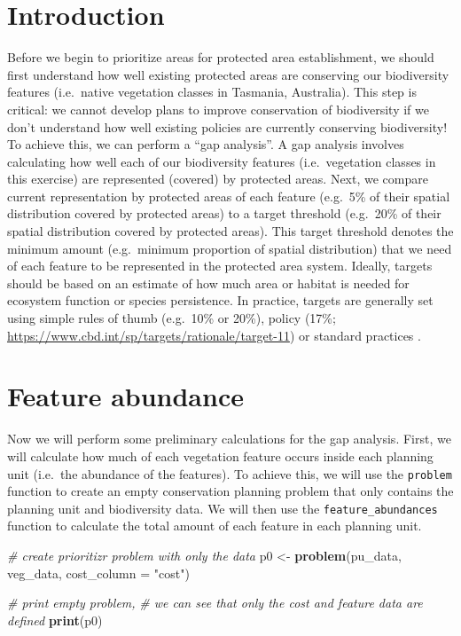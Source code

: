 \documentclass[12pt,]{book}
\newenvironment{Shaded}{\begin{snugshade}}{\end{snugshade}}
\newcommand{\KeywordTok}[1]{\textcolor[rgb]{0.13,0.29,0.53}{\textbf{#1}}}
\newcommand{\DataTypeTok}[1]{\textcolor[rgb]{0.13,0.29,0.53}{#1}}
\newcommand{\StringTok}[1]{\textcolor[rgb]{0.31,0.60,0.02}{#1}}
\newcommand{\CommentTok}[1]{\textcolor[rgb]{0.56,0.35,0.01}{\textit{#1}}}
\newcommand{\NormalTok}[1]{#1}
\begin{document}
\section{Introduction}\label{introduction-1}

Before we begin to prioritize areas for protected area establishment, we
should first understand how well existing protected areas are conserving
our biodiversity features (i.e.~native vegetation classes in Tasmania,
Australia). This step is critical: we cannot develop plans to improve
conservation of biodiversity if we don't understand how well existing
policies are currently conserving biodiversity! To achieve this, we can
perform a ``gap analysis''. A gap analysis involves calculating how well
each of our biodiversity features (i.e.~vegetation classes in this
exercise) are represented (covered) by protected areas. Next, we compare
current representation by protected areas of each feature (e.g.~5\% of
their spatial distribution covered by protected areas) to a target
threshold (e.g.~20\% of their spatial distribution covered by protected
areas). This target threshold denotes the minimum amount (e.g.~minimum
proportion of spatial distribution) that we need of each feature to be
represented in the protected area system. Ideally, targets should be
based on an estimate of how much area or habitat is needed for ecosystem
function or species persistence. In practice, targets are generally set
using simple rules of thumb (e.g.~10\% or 20\%), policy (17\%;
\url{https://www.cbd.int/sp/targets/rationale/target-11}) or standard
practices \citep[e.g.~setting targets for species based on
range-size;][]{r1, r2}.

\section{Feature abundance}\label{feature-abundance}

Now we will perform some preliminary calculations for the gap analysis.
First, we will calculate how much of each vegetation feature occurs
inside each planning unit (i.e.~the abundance of the features). To
achieve this, we will use the \texttt{problem} function to create an
empty conservation planning problem that only contains the planning unit
and biodiversity data. We will then use the \texttt{feature\_abundances}
function to calculate the total amount of each feature in each planning
unit.

\begin{Shaded}
\begin{Highlighting}[]
\CommentTok{# create prioritizr problem with only the data}
\NormalTok{p0 <-}\StringTok{ }\KeywordTok{problem}\NormalTok{(pu_data, veg_data, }\DataTypeTok{cost_column =} \StringTok{"cost"}\NormalTok{)}

\CommentTok{# print empty problem,}
\CommentTok{# we can see that only the cost and feature data are defined}
\KeywordTok{print}\NormalTok{(p0)}
\end{Highlighting}
\end{Shaded}
\end{document}
